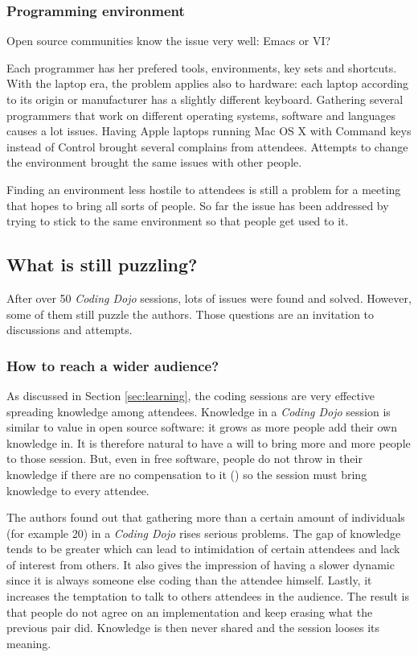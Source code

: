 \subsubsection{Programming environment}

Open source communities know the issue very well: Emacs or VI?

Each programmer has her prefered tools, environments, key sets and
shortcuts. With the laptop era, the problem applies also to hardware:
each laptop according to its origin or manufacturer has a slightly
different keyboard. Gathering several programmers that work on
different operating systems, software and languages causes a lot
issues. Having Apple laptops running Mac OS X with Command keys
instead of Control brought several complains from attendees. Attempts
to change the environment brought the same issues with other people.

Finding an environment less hostile to attendees is still a problem
for a meeting that hopes to bring all sorts of people. So far the
issue has been addressed by trying to stick to the same environment so
that people get used to it.

\subsection{What is still puzzling?}\label{ssub:puzzles}

After over 50 \textit{Coding Dojo} sessions, lots of issues were found
and solved. However, some of them still puzzle the authors. Those
questions are an invitation to discussions and attempts.

\subsubsection{How to reach a wider audience?}

As discussed in Section \ref{sec:learning}, the coding sessions
are very effective spreading knowledge among attendees. Knowledge in a
\textit{Coding Dojo} session is similar to value in open source
software: it grows as more people add their own knowledge in. It is
therefore natural to have a will to bring more and more people to
those session. But, even in free software, people do not throw in
their knowledge if there are no compensation to it
(\cite{RishabGhosh}) so the session must bring knowledge to every
attendee.

The authors found out that gathering more than a certain amount of
individuals (for example 20) in a \textit{Coding Dojo} rises serious
problems. The gap of knowledge tends to be greater which can lead to
intimidation of certain attendees and lack of interest from others. It
also gives the impression of having a slower dynamic since it is
always someone else coding than the attendee himself. Lastly, it
increases the temptation to talk to others attendees in the
audience. The result is that people do not agree on an implementation
and keep erasing what the previous pair did. Knowledge is then never
shared and the session looses its meaning.

